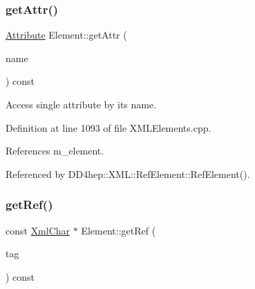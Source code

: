 \hypertarget{class_d_d4hep_1_1_x_m_l_1_1_element_a622430e78449e18efb037fec313a763e}{}\label{class_d_d4hep_1_1_x_m_l_1_1_element_a622430e78449e18efb037fec313a763e} 
\subsubsection{\texorpdfstring{get\+Attr()}{getAttr()}}
{\footnotesize\ttfamily \hyperlink{namespace_d_d4hep_1_1_x_m_l_a5c19b7116be99d69b4b22d911357baaf}{Attribute} Element\+::get\+Attr (\begin{DoxyParamCaption}\item[{const \hyperlink{namespace_d_d4hep_1_1_x_m_l_a09e5d9cc86ed782f6826dfe0778c1815}{Xml\+Char} $\ast$}]{name }\end{DoxyParamCaption}) const}



Access single attribute by it\textquotesingle{}s name. 



Definition at line 1093 of file X\+M\+L\+Elements.\+cpp.



References m\+\_\+element.



Referenced by D\+D4hep\+::\+X\+M\+L\+::\+Ref\+Element\+::\+Ref\+Element().

\hypertarget{class_d_d4hep_1_1_x_m_l_1_1_element_abaf22d4ac5b302e7d3e4a70106d43b2d}{}\label{class_d_d4hep_1_1_x_m_l_1_1_element_abaf22d4ac5b302e7d3e4a70106d43b2d} 
\subsubsection{\texorpdfstring{get\+Ref()}{getRef()}}
{\footnotesize\ttfamily const \hyperlink{namespace_d_d4hep_1_1_x_m_l_a09e5d9cc86ed782f6826dfe0778c1815}{Xml\+Char} $\ast$ Element\+::get\+Ref (\begin{DoxyParamCaption}\item[{const \hyperlink{namespace_d_d4hep_1_1_x_m_l_a09e5d9cc86ed782f6826dfe0778c1815}{Xml\+Char} $\ast$}]{tag }\end{DoxyParamCaption}) const}




